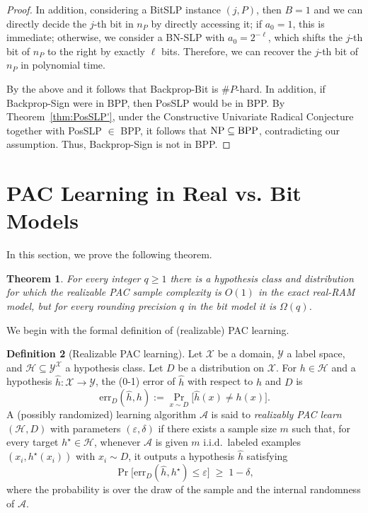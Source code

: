 \documentclass{article}
\newcommand{\cX}{\mathcal{X}}
\newcommand{\cY}{\mathcal{Y}}
\newcommand{\cH}{\mathcal{H}}
\newcommand{\cA}{\mathcal{A}}
\theoremstyle{plain}
\newtheorem{theorem}{Theorem}[section]
\theoremstyle{definition}
\newtheorem{definition}[theorem]{Definition}
\theoremstyle{remark}
\begin{document}
\begin{proof}
    In addition, considering a BitSLP instance $(j,P)$, then $B = 1$ and we can directly decide the $j$-th bit in $n_P$ by directly accessing it; if $a_0 = 1$, this is immediate; otherwise, we consider a BN-SLP with $a_0 = 2^{-\ell}$, which shifts the $j$-th bit of $n_P$ to the right by exactly $\ell$ bits. Therefore, we can recover the $j$-th bit of $n_P$ in polynomial time. 

    By the above and  it follows that Backprop-Bit is $\#P$-hard. In addition, 
	if Backprop-Sign were in BPP, then PosSLP would be in BPP. By
	Theorem~\ref{thm:PosSLP'}, under the Constructive Univariate Radical Conjecture \cite{10.1145/3510359} together with PosSLP $\in$ BPP,
	it follows that $\textnormal{NP}\subseteq\textnormal{BPP}$, contradicting our
 assumption. Thus, Backprop-Sign is not in BPP.
\end{proof}





\section{PAC Learning in Real vs. Bit Models}
\label{sec:PAC}

In this section, we prove the following theorem. 


\begin{theorem}
	\label{thm:pac-separation}
	For every integer $q\ge 1$ there is a hypothesis class and distribution
	for which the realizable \textnormal{PAC} sample complexity is $O(1)$ in the exact
	\textnormal{real-RAM} model, but for every rounding precision $q$ in the bit model it is $\Omega(q)$.  
\end{theorem}


We begin with the formal definition of (realizable) PAC learning. 
\begin{definition}[Realizable PAC learning]
	Let $\cX$ be a domain, $\cY$ a label space, and $\cH\subseteq\cY^\cX$
	a hypothesis class. Let $D$ be a distribution on $\cX$. For
	$h\in\cH$ and a hypothesis $\hat h:\cX\to\cY$, the (0-1) error of
	$\hat h$ with respect to $h$ and $D$ is
	\[
	\mathrm{err}_D(\hat h,h)
	:= \Pr_{x\sim D}\bigl[\hat h(x) \ne h(x)\bigr].
	\]
	A (possibly randomized) learning algorithm $\cA$ is said to
	\emph{realizably PAC learn} $(\cH,D)$ with parameters
	$(\varepsilon,\delta)$ if there exists a sample size $m$ such that,
	for every target $h^\star\in\cH$, whenever $\cA$ is given $m$
	i.i.d.\ labeled examples $(x_i,h^\star(x_i))$ with $x_i\sim D$, it
	outputs a hypothesis $\hat h$ satisfying
	\[
	\Pr\bigl[\mathrm{err}_D(\hat h,h^\star) \le \varepsilon\bigr]
	\;\ge\; 1-\delta,
	\]
	where the probability is over the draw of the sample and the
	internal randomness of $\cA$.
\end{definition}
\end{document}
